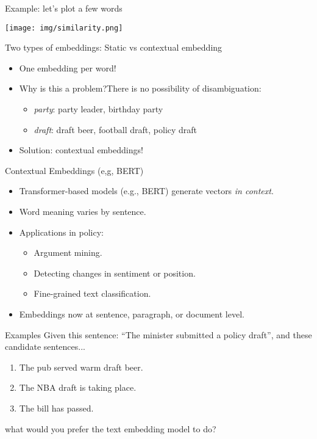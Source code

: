 \documentclass{beamer}
\begin{document}
\begin{frame}{Example: let's plot a few words}
    \begin{center}
        \texttt{[image: img/similarity.png]}
    \end{center}
\end{frame}
    
\begin{frame}{Two types of embeddings: Static vs contextual embedding}
    \begin{itemize}
        \item One embedding per word!
        \item Why is this a problem?There is no possibility of disambiguation:
        \begin{itemize}
            \item \textit{party}: party leader, birthday party
            \item \textit{draft}: draft beer, football draft, policy draft
        \end{itemize}
        \item Solution: contextual embeddings!
    \end{itemize}
\end{frame}

\begin{frame}{Contextual Embeddings (e,g, BERT)}
    \begin{itemize}
        \item Transformer-based models (e.g., BERT) generate vectors \textit{in context}.
        \item Word meaning varies by sentence.
        \item Applications in policy:
        \begin{itemize}
            \item Argument mining.
            \item Detecting changes in sentiment or position.
            \item Fine-grained text classification.
        \end{itemize}
        \item Embeddings now at sentence, paragraph, or document level.
    \end{itemize}
\end{frame}

\begin{frame}{Examples}
    Given this sentence: ``The minister submitted a policy draft'', and these candidate sentences... 
    \vspace{0.5cm}
    \begin{enumerate}
        \item The pub served warm draft beer.
        \item The NBA draft is taking place.
        \item The bill has passed.
    \end{enumerate}
    \vspace{0.5cm}
     what would you prefer the text embedding model to do?
\end{frame}
\end{document}
